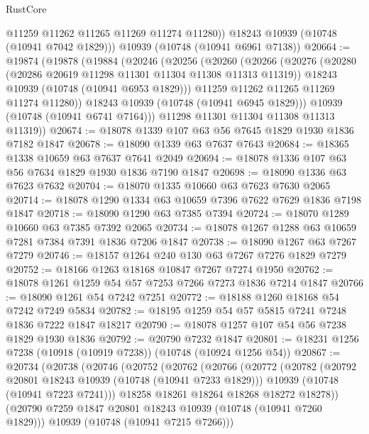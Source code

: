 \begin{lexlean}{RustCore}
\begin{coremodule}
          @11259
          @11262
          @11265
          @11269
          @11274
          @11280))
      @18243
      @10939
      (@10748 (@10941 @7042 @1829)))
    @10939
    (@10748 (@10941 @6961 @7138))
@20664 := @19874
    (@19878
      (@19884
        (@20246
          (@20256
            (@20260
              (@20266
                (@20276
                  (@20280 (@20286 @20619 @11298 @11301 @11304 @11308 @11313 @11319))
                  @18243
                  @10939
                  (@10748 (@10941 @6953 @1829)))
                @11259
                @11262
                @11265
                @11269
                @11274
                @11280))
            @18243
            @10939
            (@10748 (@10941 @6945 @1829)))
          @10939
          (@10748 (@10941 @6741 @7164)))
        @11298
        @11301
        @11304
        @11308
        @11313
        @11319))
@20674 := @18078 @1339 @107 @63 @56 @7645 @1829 @1930 @1836 @7182 @1847
@20678 := @18090 @1339 @63 @7637 @7643
@20684 := @18365 @1338 @10659 @63 @7637 @7641 @2049
@20694 := @18078 @1336 @107 @63 @56 @7634 @1829 @1930 @1836 @7190 @1847
@20698 := @18090 @1336 @63 @7623 @7632
@20704 := @18070 @1335 @10660 @63 @7623 @7630 @2065
@20714 := @18078 @1290 @1334 @63 @10659 @7396 @7622 @7629 @1836 @7198 @1847
@20718 := @18090 @1290 @63 @7385 @7394
@20724 := @18070 @1289 @10660 @63 @7385 @7392 @2065
@20734 := @18078 @1267 @1288 @63 @10659 @7281 @7384 @7391 @1836 @7206 @1847
@20738 := @18090 @1267 @63 @7267 @7279
@20746 := @18157 @1264 @240 @130 @63 @7267 @7276 @1829 @7279
@20752 := @18166 @1263 @18168 @10847 @7267 @7274 @1950
@20762 := @18078 @1261 @1259 @54 @57 @7253 @7266 @7273 @1836 @7214 @1847
@20766 := @18090 @1261 @54 @7242 @7251
@20772 := @18188 @1260 @18168 @54 @7242 @7249 @5834
@20782 := @18195 @1259 @54 @57 @5815 @7241 @7248 @1836 @7222 @1847 @18217
@20790 := @18078 @1257 @107 @54 @56 @7238 @1829 @1930 @1836
@20792 := @20790 @7232 @1847
@20801 := @18231 @1256 @7238 (@10918 (@10919 @7238)) (@10748 (@10924 @1256 @54))
@20867 := @20734
    (@20738
      (@20746
        (@20752
          (@20762
            (@20766
              (@20772
                (@20782
                  (@20792 @20801 @18243 @10939 (@10748 (@10941 @7233 @1829)))
                  @10939
                  (@10748 (@10941 @7223 @7241)))
                @18258
                @18261
                @18264
                @18268
                @18272
                @18278))
            (@20790 @7259 @1847 @20801 @18243 @10939 (@10748 (@10941 @7260 @1829)))
            @10939
            (@10748 (@10941 @7215 @7266)))

\end{coremodule}
\end{lexlean}
